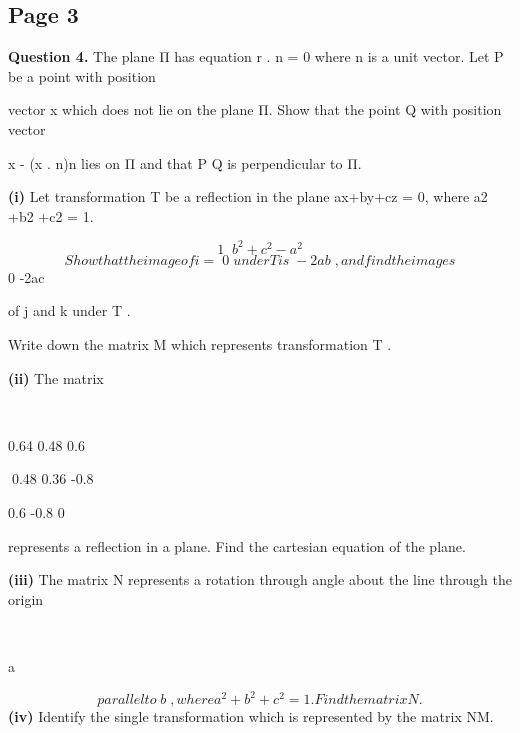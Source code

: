 \documentclass[12pt]{article}
\begin{document}
\subsection*{Page 3}
\begin{flushleft}
\bigskip\textbf{Question 4.} The plane Π has equation r . n = 0 where n is a unit vector. Let P be a point with position\par
vector x which does not lie on the plane Π. Show that the point Q with position vector\par
x - (x . n)n lies on Π and that P Q is perpendicular to Π.\par
\textbf{(i)} Let transformation T be a reflection in the plane ax+by+cz = 0, where a2 +b2 +c2 = 1.\par
\[ 1   b^2 + c^2 - a^2 \]
\[Show that the image of i =  0  under T is  -2ab , and find the images\]
0 -2ac\par
of j and k under T .\par
Write down the matrix M which represents transformation T .\par
\textbf{(ii)} The matrix\par
 \par
0.64 0.48 0.6\par
0.48 0.36 -0.8\par
0.6 -0.8 0\par
represents a reflection in a plane. Find the cartesian equation of the plane.\par
\textbf{(iii)} The matrix N represents a rotation through angle \pi about the line through the origin\par
 \par
a\par
\[parallel to  b , where a^2 + b^2 + c^2 = 1. Find the matrix N.\]
\textbf{(iv)} Identify the single transformation which is represented by the matrix NM.\par
\end{flushleft}
\end{document}
